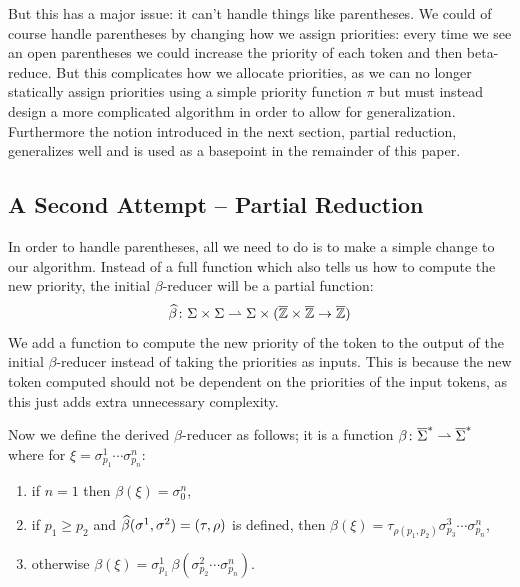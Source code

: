 \documentclass{llncs}
\newcounter{algo}
\begin{document}
But this has a major issue: it can't handle things like parentheses.
We could of course handle parentheses by changing how we assign priorities: every time we see an open parentheses we could increase
the priority of each token and then beta-reduce.
But this complicates how we allocate priorities, as we can no longer statically assign priorities using a simple priority function $\pi$ but must instead design a more complicated algorithm in order
to allow for generalization.
Furthermore the notion introduced in the next section, partial reduction, generalizes well and is used as a basepoint in the
remainder of this paper.

\subsection{A Second Attempt -- Partial Reduction}

In order to handle parentheses, all we need to do is to make a simple change to our algorithm.
Instead of a full function which also tells us how to compute the new priority, the initial $\beta$-reducer will be a partial function:
\[ \widehat\beta\colon \Sigma\times\Sigma\rightharpoonup\Sigma\times(\overline{\mathbb Z}\times\overline{\mathbb Z}\to\overline{\mathbb Z}) \]
We add a function to compute the new priority of the token to the output of the initial $\beta$-reducer instead of taking the priorities as inputs.
This is because the new token computed should not be dependent on the priorities of the input tokens, as this just adds extra unnecessary
complexity.

Now we define the derived $\beta$-reducer as follows; it is a function $\beta\colon\overline\Sigma^*\rightharpoonup\overline\Sigma^*$ where for $\xi=\sigma^1_{p_1}\cdots\sigma^n_{p_n}$:
\begin{enumerate}
    \item if $n=1$ then $\beta(\xi)=\sigma^n_0$,
    \item if $p_1\geq p_2$ and $\widehat\beta(\sigma^1,\sigma^2)=(\tau,\rho)$ is defined, then $\beta(\xi)=\tau_{\rho(p_1,p_2)}\sigma^3_{p_3}\cdots\sigma^n_{p_n}$,
    \item otherwise $\beta(\xi)=\sigma^1_{p_1}\,\beta(\sigma^2_{p_2}\cdots\sigma^n_{p_n})$.
\end{enumerate}
\end{document}
